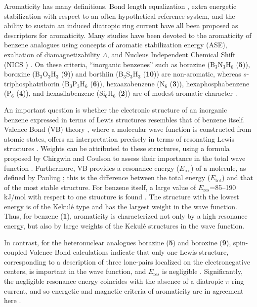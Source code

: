Aromaticity has many definitions.
Bond length equalization \cite{arom1}, extra energetic
stabilization \cite{arom2} with respect to an often hypothetical reference
system, and the ability to sustain an induced diatropic ring current \cite{ring4,ring1,ring2,ring3,nics}
have all been proposed as
descriptors for aromaticity. Many studies have been devoted to the aromaticity
of benzene analogues using concepts of aromatic stabilization energy (ASE),
exaltation of diamagnetizability $\Lambda$, and Nucleus Independent Chemical
Shift (NICS \cite{nics}) \cite{fink,jemmis,cooper,fowler1,schleyer1,soncini1}. On
these criteria, ``inorganic benzenes'' such as borazine (B$_3$N$_3$H$_6$ (\textbf{5})),
boroxine (B$_3$O$_3$H$_3$ (\textbf{9})) and borthiin (B$_3$S$_3$H$_3$ (\textbf{10})) are non-aromatic,
whereas $s$-triphosphatriborin (B$_3$P$_3$H$_6$ (\textbf{6})), hexaazabenzene (N$_6$ (\textbf{3})),
hexaphosphabenzene (P$_6$ (\textbf{4})), and hexasilabenzene (Si$_6$H$_6$ (\textbf{2})) are of modest
aromatic character \cite{schleyer1}.

An important question is whether the electronic structure of an inorganic
benzene expressed in terms of Lewis structures resembles that of benzene
itself. Valence Bond (VB) theory \cite{heitler}, where a molecular wave
function is constructed from atomic states, offers an interpretation precisely
in terms of resonating Lewis structures \cite{lewis}. Weights can be attributed
to these structures, using a formula proposed by Chirgwin and Coulson to assess
their importance in the total wave function \cite{chirgwin}. Furthermore, VB
provides a resonance energy ($E_{\mathrm{res}}$) of a molecule, as
defined by Pauling \cite{pauling}; this is the difference between the
total energy ($E_{\mathrm{tot}}$) and that of the most stable
structure. For benzene itself, a large value of 
$E_{\mathrm{res}}$=85--190 kJ/mol with respect to one
structure is found \cite{benzbovb,nature,fokke}. The structure with the lowest energy is
of the Kekul\'e type and has the largest weight in the wave function. Thus,
for benzene (\textbf{1}), aromaticity is characterized not only by a high
resonance energy, but also by large weights of the Kekul\'e
structures in the wave function.

In contrast, for the heteronuclear analogues borazine (\textbf{5}) and boroxine (\textbf{9}),
spin-coupled Valence Bond calculations indicate that only one Lewis structure,
corresponding to a description of three lone-pairs localized on the
electronegative centers, is important in the wave function, and
$E_{\mathrm{res}}$ is negligible \cite{cooper}. Significantly, the negligible
resonance energy coincides with the absence of a diatropic $\pi$ ring current, and so
energetic and magnetic criteria of aromaticity are in agreement here \cite{fowler1}.

